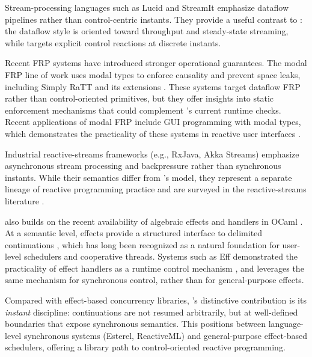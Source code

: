 Stream-processing languages such as Lucid and StreamIt
\cite{ashcroft1977lucid,thies2002streamit} emphasize dataflow pipelines rather
than control-centric instants. They provide a useful contrast to \tempo{}: the
dataflow style is oriented toward throughput and steady-state streaming, while
\tempo{} targets explicit control reactions at discrete instants.

Recent FRP systems have introduced stronger operational guarantees. The
modal FRP line of work uses modal types to enforce causality and prevent space
leaks, including Simply RaTT and its extensions
\cite{bahr2019ratt,bahr2022modalfrp,bahr2023async}. These systems target
dataflow FRP rather than control-oriented primitives, but they offer insights
into static enforcement mechanisms that could complement \tempo{}'s current
runtime checks.
Recent applications of modal FRP include GUI programming with modal types,
which demonstrates the practicality of these systems in reactive user
interfaces \cite{bahr2025gui}.

Industrial reactive-streams frameworks (e.g., RxJava, Akka Streams) emphasize
asynchronous stream processing and backpressure rather than synchronous
instants. While their semantics differ from \tempo{}'s model, they represent a
separate lineage of reactive programming practice and are surveyed in the
reactive-streams literature \cite{cheng2017reactivestreams,davis2019reactivestreams}.

\tempo{} also builds on the recent availability of algebraic effects and handlers
in OCaml \cite{multicoreocaml2020}. At a semantic level, effects provide a
structured interface to delimited continuations
\cite{danvyfilinski1990,filinski1994,plotkinpretnar2009}, which has long been
recognized as a natural foundation for user-level schedulers and cooperative
threads. Systems such as Eff demonstrated the practicality of effect handlers
as a runtime control mechanism \cite{eff2013}, and \tempo{} leverages the same
mechanism for synchronous control, rather than for general-purpose effects.

Compared with effect-based concurrency libraries, \tempo{}'s distinctive
contribution is its \emph{instant} discipline: continuations are not resumed
arbitrarily, but at well-defined boundaries that expose synchronous semantics.
This positions \tempo{} between language-level synchronous systems (Esterel,
ReactiveML) and general-purpose effect-based schedulers, offering a library
path to control-oriented reactive programming.
